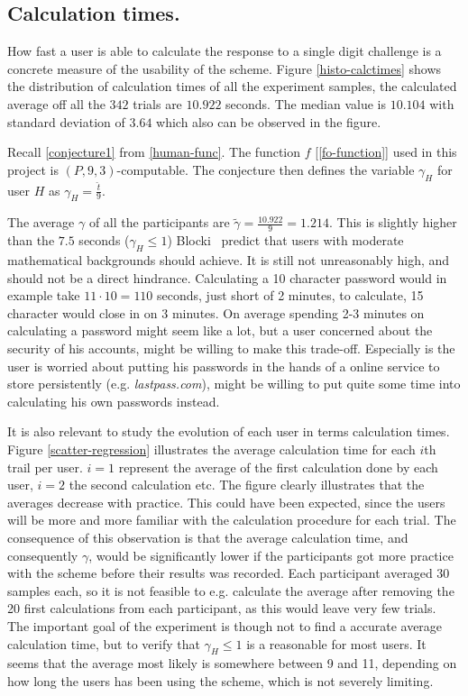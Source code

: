\subsection{Calculation times.}
How fast a user is able to calculate the response to a single digit challenge is a concrete measure of the usability of the scheme. Figure \ref{histo-calctimes} shows the distribution of calculation times of all the experiment samples, the calculated average off all the $342$ trials are $10.922$ seconds. The median value is $10.104$ with standard deviation of $3.64$ which also can be observed in the figure. 
\par Recall \autoref{conjecture1} from \autoref{human-func}. The function $f$ [\autoref{fo-function}] used in this project is $(P,9,3)$-computable. The conjecture then defines the variable $\gamma_H$ for user $H$ as {\Large $\gamma_H = \frac{\hat t}{9}$}. 
\par The average $\gamma$ of all the participants are $\tilde \gamma = \frac{10.922}{9} = 1.214$. This is slightly higher than the $7.5$ seconds ($\gamma_H \le 1 $) Blocki~\cite{hcp-blocki} predict that users with moderate mathematical backgrounds should achieve. It is still not unreasonably high, and should not be a direct hindrance. Calculating a 10 character password would in example take $11 \cdot 10 = 110$ seconds, just short of 2 minutes, to calculate, 15 character would close in on 3 minutes. On average spending 2-3 minutes on calculating a password might seem like a lot, but a user concerned about the security of his accounts, might be willing to make this trade-off. Especially is the user is worried about putting his passwords in the hands of a online service to store persistently (e.g. \emph{lastpass.com}), might be willing to put quite some time into calculating his own passwords instead.
\par It is also relevant to study the evolution of each user in terms calculation times. Figure \ref{scatter-regression} illustrates the average calculation time for each $i$th trail per user. $i=1$ represent the average of the first calculation done by each user, $i=2$ the second calculation etc. The figure clearly illustrates that the averages decrease with practice. This could have been expected, since the users will be more and more familiar with the calculation procedure for each trial. The consequence of this observation is that the average calculation time, and consequently $\gamma$, would be significantly lower if the participants got more practice with the scheme before their results was recorded. Each participant averaged $30$ samples each, so it is not feasible to e.g. calculate the average after removing the 20 first calculations from each participant, as this would leave very few trials. The important goal of the experiment is though not to find a accurate average calculation time, but to verify that $\gamma_H \le 1$ is a reasonable for most users. It seems that the average most likely is somewhere between 9 and 11, depending on how long the users has been using the scheme, which is not severely limiting.

